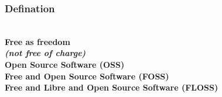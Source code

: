 \begin{frame}
  \frametitle{Defination}
  \begin{center}
    \textbf{\Large
      \pause \\
      \alert{Free as freedom} \\
      \emph{(not free of charge)} \pause \\
      Open Source Software (OSS)  \pause \\
      Free and Open Source Software (FOSS) \pause \\
      Free and Libre and Open Source Software  (FLOSS) \\ \pause
    }
  \end{center}
\end{frame}